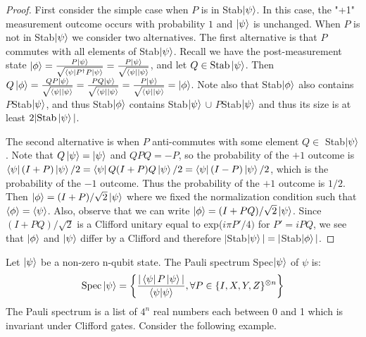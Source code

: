 \documentclass[12pt]{dalthesis}
\begin{document}
\begin{proof}
First consider the simple case when $P$ is in Stab$\ket{\psi}$. In this case, the "+1" measurement outcome occurs with probability $1$ and $\ket{\psi}$ is unchanged. When $P$ is not in Stab$\ket{\psi}$ we consider two alternatives. The first alternative is that $P$ commutes with all elements of Stab$\ket{\psi}$. Recall we have the post-measurement state $\ket{\phi} = \frac{P\ket{\psi}}{\sqrt{\bra{\psi}P^{\dag}P\ket{\psi}}} = \frac{P\ket{\psi}}{\sqrt{\bra{\psi}\ket{\psi}}}$, and let $Q \in \text{Stab}\ket{\psi}$. Then $Q\ket{\phi} = \frac{QP\ket{\psi}}{\sqrt{\bra{\psi}\ket{\psi}}} = \frac{PQ\ket{\psi}}{\sqrt{\bra{\psi}\ket{\psi}}} = \frac{P\ket{\psi}}{\sqrt{\bra{\psi}\ket{\psi}}} = \ket{\phi}$. Note also that Stab$\ket{\phi}$ also contains $P$Stab$\ket{\psi}$, and thus Stab$\ket{\phi}$ contains Stab$\ket{\psi}$ $\cup$ $P$Stab$\ket{\psi}$ and thus its size is at least $2| \text{Stab}\ket{\psi}|$.

The second alternative is when $P$ anti-commutes with some element $Q \in$ Stab$\ket{\psi}$. Note that $Q\ket{\psi} = \ket{\psi}$ and $QPQ = -P$, so the probability of the $+1$ outcome is $\bra{\psi}(I+P)\ket{\psi}/2 = \bra{\psi}Q(I+P)Q\ket{\psi}/2 = \bra{\psi}(I-P)\ket{\psi}/2$, which is the probability of the $-1$ outcome. Thus the probability of the $+1$ outcome is $1/2$. Then $\ket{\phi} = (I+P)/\sqrt{2}\ket{\psi}$ where we fixed the normalization condition such that $\braket{\phi} = \braket{\psi}$. Also, observe that we can write $\ket{\phi} = (I+PQ)/\sqrt{2}\ket{\psi}$. Since $(I+PQ)/\sqrt{2}$ is a Clifford unitary equal to exp($i\pi P'/4)$ for $P' = iPQ$, we see that $\ket{\phi}$ and $\ket{\psi}$ differ by a Clifford and therefore $|$Stab$\ket{\psi}| = |$Stab$\ket{\phi}|$.
\end{proof}

\begin{definition}
Let $\ket{\psi}$ be a non-zero n-qubit state. The Pauli spectrum Spec$\ket{\psi}$ of $\psi$ is:
\begin{equation}
\text{Spec}\ket{\psi} = \left\{ \frac{|\bra{\psi}P\ket{\psi}|}{\braket{\psi|\psi}}, \forall P \in \{I, X, Y, Z\}^{\otimes n} \right\}
\end{equation}
The Pauli spectrum is a list of $4^n$ real numbers each between 0 and 1 which is invariant under Clifford gates. Consider the following example.
\end{definition}
\end{document}
